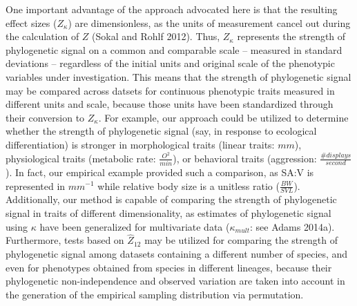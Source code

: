 \documentclass[]{article}
\begin{document}
One important advantage of the approach advocated here is that the
resulting effect sizes (\(Z_\kappa\)) are dimensionless, as the units of
measurement cancel out during the calculation of \(Z\) (Sokal and Rohlf
2012). Thus, \(Z_\kappa\) represents the strength of phylogenetic signal
on a common and comparable scale -- measured in standard deviations --
regardless of the initial units and original scale of the phenotypic
variables under investigation. This means that the strength of
phylogenetic signal may be compared across datsets for continuous
phenotypic traits measured in different units and scale, because those
units have been standardized through their conversion to \(Z_\kappa\).
For example, our approach could be utilized to determine whether the
strength of phylogenetic signal (say, in response to ecological
differentiation) is stronger in morphological traits (linear traits:
\(mm\)), physiological traits (metabolic rate: \(\frac{O^2}{min}\)), or
behavioral traits (aggression: \(\frac{\#{displays}}{second}\)). In
fact, our empirical example provided such a comparison, as SA:V is
represented in \(mm^{-1}\) while relative body size is a unitless ratio
(\(\frac{BW}{SVL}\)). Additionally, our method is capable of comparing
the strength of phylogenetic signal in traits of different
dimensionality, as estimates of phylogenetic signal using \(\kappa\)
have been generalized for multivariate data (\(\kappa_{mult}\): see
Adams 2014a). Furthermore, tests based on \(\hat{Z}_{12}\) may be
utilized for comparing the strength of phylogenetic signal among
datasets containing a different number of species, and even for
phenotypes obtained from species in different lineages, because their
phylogenetic non-independence and observed variation are taken into
account in the generation of the empirical sampling distribution via
permutation. \hfill\break
\end{document}
